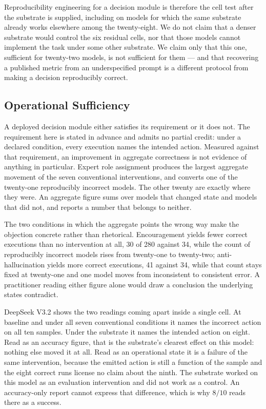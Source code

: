 Reproducibility engineering for a decision module is therefore the cell test after
the substrate is supplied, including on models for which the same substrate already
works elsewhere among the twenty-eight. We do not claim that a denser substrate would
control the six residual cells, nor that those models cannot implement the task under
some other substrate. We claim only that this one, sufficient for twenty-two models,
is not sufficient for them --- and that recovering a published metric from an
underspecified prompt is a different protocol from making a decision reproducibly
correct.


\subsection{Operational Sufficiency}
\label{sec:operational-sufficiency}

A deployed decision module either satisfies its requirement or it does not. The
requirement here is stated in advance and admits no partial credit: under a declared
condition, every execution names the intended action. Measured against that
requirement, an improvement in aggregate correctness is not evidence of anything in
particular. Expert role assignment produces the largest aggregate movement of the
seven conventional interventions, and converts one of the twenty-one reproducibly
incorrect models. The other twenty are exactly where they were. An aggregate figure
sums over models that changed state and models that did not, and reports a number
that belongs to neither.

The two conditions in which the aggregate points the wrong way make the objection
concrete rather than rhetorical. Encouragement yields fewer correct executions than
no intervention at all, 30 of 280 against 34, while the count of reproducibly
incorrect models rises from twenty-one to twenty-two; anti-hallucination yields more
correct executions, 41 against 34, while that count stays fixed at twenty-one and one
model moves from inconsistent to consistent error. A practitioner reading either
figure alone would draw a conclusion the underlying states contradict.

DeepSeek V3.2 shows the two readings coming apart inside a single cell. At baseline
and under all seven conventional conditions it names the incorrect action on all ten
samples. Under the substrate it names the intended action on eight. Read as an
accuracy figure, that is the substrate's clearest effect on this model: nothing else
moved it at all. Read as an operational state it is a failure of the same
intervention, because the emitted action is still a function of the sample and the
eight correct runs license no claim about the ninth. The substrate worked on this
model as an evaluation intervention and did not work as a control. An accuracy-only
report cannot express that difference, which is why $8/10$ reads there as a success.

